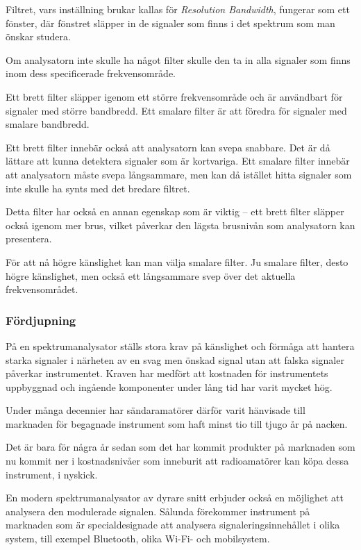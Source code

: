 Filtret, vars inställning brukar kallas för \emph{Resolution Bandwidth},
fungerar som ett fönster, där fönstret släpper in de signaler som finns i det
spektrum som man önskar studera.

Om analysatorn inte skulle ha något filter skulle den ta in alla signaler som
finns inom dess specificerade frekvensområde.

Ett brett filter släpper igenom ett större frekvensområde och är användbart för
signaler med större bandbredd.
Ett smalare filter är att föredra för signaler med smalare bandbredd.

Ett brett filter innebär också att analysatorn kan svepa snabbare.
Det är då lättare att kunna detektera signaler som är kortvariga.
Ett smalare filter innebär att analysatorn måste svepa långsammare, men kan då
istället hitta signaler som inte skulle ha synts med det bredare filtret.

Detta filter har också en annan egenskap som är viktig -- ett brett filter
släpper också igenom mer brus, vilket påverkar den lägsta brusnivån som
analysatorn kan presentera.

För att nå högre känslighet kan man välja smalare filter.
Ju smalare filter, desto högre känslighet, men också ett långsammare svep över
det aktuella frekvensområdet.

\subsubsection{Fördjupning}

På en spektrumanalysator ställs stora krav på känslighet och förmåga att hantera
starka signaler i närheten av en svag men önskad signal utan att falska signaler
påverkar instrumentet.
Kraven har medfört att kostnaden för instrumentets uppbyggnad och ingående
komponenter under lång tid har varit mycket hög.

Under många decennier har sändaramatörer därför varit hänvisade till
marknaden för begagnade instrument som haft minst tio till tjugo år på nacken.

Det är bara för några år sedan som det har kommit produkter på marknaden som nu
kommit ner i kostnadsnivåer som inneburit att radioamatörer kan köpa dessa
instrument, i nyskick.

En modern spektrumanalysator av dyrare snitt erbjuder också en möjlighet att
analysera den modulerade signalen.
Sålunda förekommer instrument på marknaden som är specialdesignade att
analysera signaleringsinnehållet i olika system, till exempel Bluetooth, olika
Wi-Fi- och mobilsystem.


